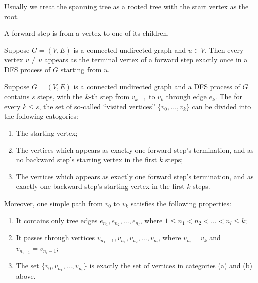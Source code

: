 Usually we treat the spanning tree as a rooted tree with the start vertex as the root. 

\begin{corollary}
    A forward step is from a vertex to one of its children. 
\end{corollary}

\begin{lemma}
    Suppose $G=(V,E)$ is a connected undirected graph and $u\in V$. Then every vertex $v\neq u$ appears as the terminal vertex of a forward step exactly once in a DFS process of $G$ starting from $u$.
\end{lemma}

\begin{lemma}
    Suppose $G=(V,E)$ is a connected undirected graph and a DFS process of $G$ contains $s$ steps, with the $k$-th step from $v_{k-1}$ to $v_k$ through edge $e_k$. The for every $k\leq s$, the set of so-called ``visited vertices'' $\{v_0,\dots,v_k\}$ can be divided into the following catogories: 
    \begin{enumerate}[itemindent=0ex, itemsep=0pt, label=\upshape{(\alph*)}]
        \item The starting vertex;
        \item The vertices which appears as exactly one forward step's termination, and as no backward step's starting vertex in the first $k$ steps;
        \item The vertices which appears as exactly one forward step's termination, and as exactly one backward step's starting vertex in the first $k$ steps. 
    \end{enumerate}

    Moreover, one simple path from $v_0$ to $v_k$ satisfies the following properties:
    \begin{enumerate}[itemindent=0ex, itemsep=0pt, label=\upshape{(\alph*)}]
        \item It contains only tree edges $e_{n_1},e_{n_2},\dots,e_{n_l}$, where $1\leq n_1<n_2<\dots<n_l\leq k$;
        \item It passes through vertices $v_{n_1-1}, v_{n_1}, v_{n_2}, \dots, v_{n_l}$, where $v_{n_l}=v_k$ and $v_{n_{i-1}}=v_{{n_i}-1}$; 
        \item The set $\{v_0, v_{n_1}, \dots, v_{n_l}\}$ is exactly the set of vertices in categories \textup{(a)} and \textup{(b)} above. 
    \end{enumerate}
\end{lemma}

